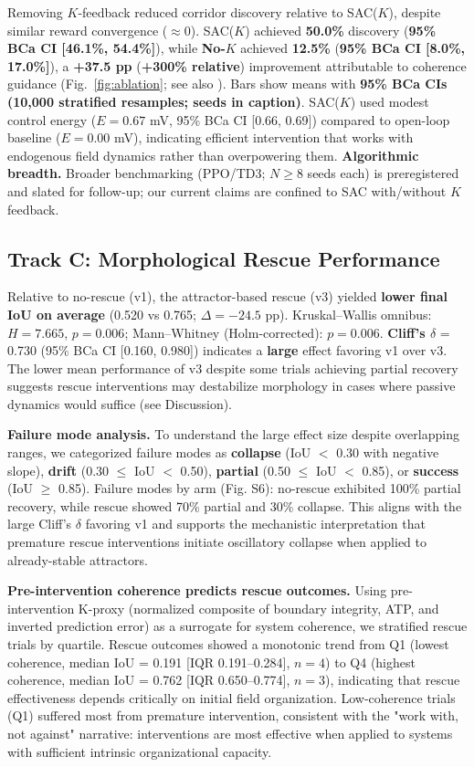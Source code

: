 \documentclass[10pt,letterpaper]{article}
\begin{document}
Removing $K$-feedback reduced corridor discovery relative to SAC($K$), despite similar reward convergence ($\approx 0$). SAC($K$) achieved \textbf{50.0\%} discovery (\textbf{95\% BCa CI [46.1\%, 54.4\%]}), while \textbf{No-$K$} achieved \textbf{12.5\%} (\textbf{95\% BCa CI [8.0\%, 17.0\%]}), a \textbf{+37.5 pp} (\textbf{+300\% relative}) improvement attributable to coherence guidance (Fig.~\ref{fig:ablation}; see also ). Bars show means with \textbf{95\% BCa CIs (10,000 stratified resamples; seeds in caption)}. SAC($K$) used modest control energy ($E = 0.67$ mV, 95\% BCa CI [0.66, 0.69]) compared to open-loop baseline ($E = 0.00$ mV), indicating efficient intervention that works with endogenous field dynamics rather than overpowering them. \textbf{Algorithmic breadth.} Broader benchmarking (PPO/TD3; $N \geq 8$ seeds each) is preregistered and slated for follow-up; our current claims are confined to SAC with/without $K$ feedback.

\subsection*{Track C: Morphological Rescue Performance}

Relative to no-rescue (v1), the attractor-based rescue (v3) yielded \textbf{lower final IoU on average} (0.520 vs 0.765; $\Delta = -24.5$ pp). Kruskal–Wallis omnibus: $H = 7.665$, $p = 0.006$; Mann–Whitney (Holm-corrected): $p = 0.006$. \textbf{Cliff's $\delta$} = 0.730 (95\% BCa CI [0.160, 0.980]) indicates a \textbf{large} effect favoring v1 over v3. The lower mean performance of v3 despite some trials achieving partial recovery suggests rescue interventions may destabilize morphology in cases where passive dynamics would suffice (see Discussion).

\textbf{Failure mode analysis.} To understand the large effect size despite overlapping ranges, we categorized failure modes as \textbf{collapse} (IoU $<$ 0.30 with negative slope), \textbf{drift} (0.30 $\leq$ IoU $<$ 0.50), \textbf{partial} (0.50 $\leq$ IoU $<$ 0.85), or \textbf{success} (IoU $\geq$ 0.85). Failure modes by arm (Fig. S6): no-rescue exhibited 100\% partial recovery, while rescue showed 70\% partial and 30\% collapse. This aligns with the large Cliff's $\delta$ favoring v1 and supports the mechanistic interpretation that premature rescue interventions initiate oscillatory collapse when applied to already-stable attractors.

\textbf{Pre-intervention coherence predicts rescue outcomes.} Using pre-intervention K-proxy (normalized composite of boundary integrity, ATP, and inverted prediction error) as a surrogate for system coherence, we stratified rescue trials by quartile. Rescue outcomes showed a monotonic trend from Q1 (lowest coherence, median IoU = 0.191 [IQR 0.191–0.284], $n=4$) to Q4 (highest coherence, median IoU = 0.762 [IQR 0.650–0.774], $n=3$), indicating that rescue effectiveness depends critically on initial field organization. Low-coherence trials (Q1) suffered most from premature intervention, consistent with the "work with, not against" narrative: interventions are most effective when applied to systems with sufficient intrinsic organizational capacity.
\end{document}
